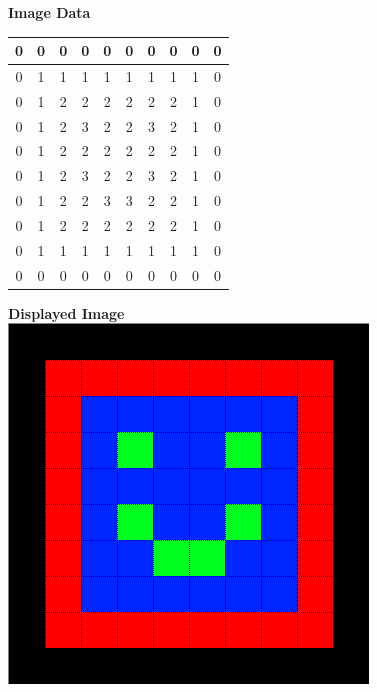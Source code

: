       \begin{minipage}[t]{0.4\textwidth}
        \begin{center}
          \textbf{Image Data}
          \ \\[9pt]
          \renewcommand\arraystretch{1.475}
          \ttfamily\footnotesize
          \begin{tabular}{| c | c | c | c | c | c | c | c | c | c | }
            \hline
            0 & 0 & 0 & 0 & 0 & 0 & 0 & 0 & 0 & 0 \\
            \hline         
            0 & 1 & 1 & 1 & 1 & 1 & 1 & 1 & 1 & 0 \\
            \hline         
            0 & 1 & 2 & 2 & 2 & 2 & 2 & 2 & 1 & 0 \\
            \hline         
            0 & 1 & 2 & 3 & 2 & 2 & 3 & 2 & 1 & 0 \\
            \hline         
            0 & 1 & 2 & 2 & 2 & 2 & 2 & 2 & 1 & 0 \\
            \hline         
            0 & 1 & 2 & 3 & 2 & 2 & 3 & 2 & 1 & 0 \\
            \hline         
            0 & 1 & 2 & 2 & 3 & 3 & 2 & 2 & 1 & 0 \\
            \hline         
            0 & 1 & 2 & 2 & 2 & 2 & 2 & 2 & 1 & 0 \\
            \hline         
            0 & 1 & 1 & 1 & 1 & 1 & 1 & 1 & 1 & 0 \\
            \hline         
            0 & 0 & 0 & 0 & 0 & 0 & 0 & 0 & 0 & 0 \\         
            \hline         
          \end{tabular}
        \end{center}
      \end{minipage}
      \begin{minipage}[t]{0.4\textwidth}
        \begin{center}
          \textbf{Displayed Image}
          \ \\[9pt]
          \includegraphics[scale=0.4]{files/RasterImageExample}
        \end{center}
      \end{minipage}
